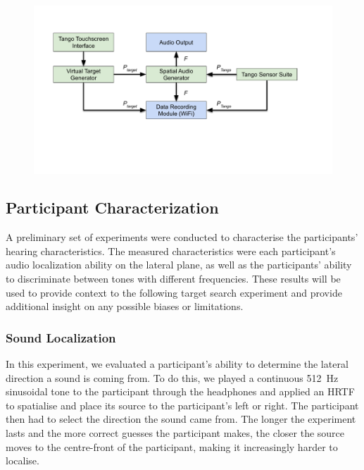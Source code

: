 \documentclass[acmsmall]{acmart}
\begin{document}
\begin{figure}
  \centering
  \includegraphics[clip=true, trim=0 120 80 50, width=0.8\columnwidth]{figures/pipeline.pdf}
  \label{fig:pipeline}
\end{figure}

\subsection{Participant Characterization}\label{sec:participant_characterisation}

A preliminary set of experiments were conducted to characterise the participants' hearing characteristics.
The measured characteristics were each participant's audio localization ability on the lateral plane, as well as the participants' ability to discriminate between tones with different frequencies. 
These results will be used to provide context to the following target search experiment and provide additional insight on any possible biases or limitations. 

\subsubsection{Sound Localization}\label{sec:sound_localisation}

In this experiment, we evaluated a participant's ability to determine the lateral direction a sound is coming from.
To do this, we played a continuous \SI{512}{\hertz} sinusoidal tone to the participant through the headphones and applied an HRTF to spatialise and place its source to the participant's left or right.
The participant then had to select the direction the sound came from.
The longer the experiment lasts and the more correct guesses the participant makes, the closer the source moves to the centre-front of the participant, making it increasingly harder to localise. 
\end{document}

